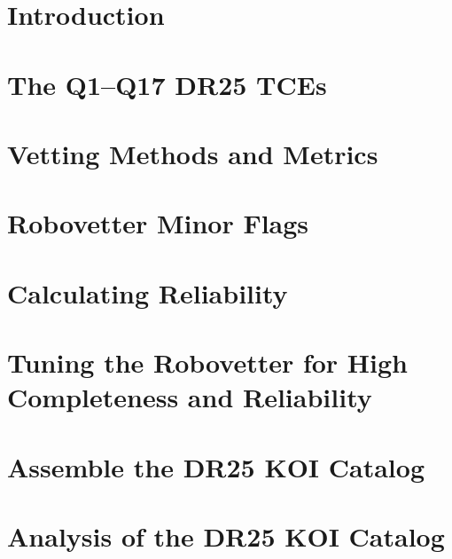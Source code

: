 \documentclass[apj,twocolappendix,numberedappendix]{emulateapj}
\renewcommand{\_}{\discretionary{\underscore}{}{\underscore}}  %
\begin{document}
\begin{abstract}
\end{abstract}


\section{Introduction}



\section{The Q1--Q17 DR25 TCEs}
\label{tcesec}




\section{Vetting Methods and Metrics}

\section{Robovetter Minor Flags}

\section{Calculating Reliability}


\section{Tuning the Robovetter for High Completeness and Reliability}



\section{Assemble the DR25 KOI Catalog}



\section{Analysis of the DR25 KOI Catalog}
\end{document}
